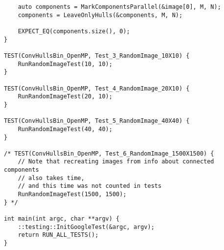 \documentclass[14pt, russian]{extarticle}
\begin{document}
\begin{lstlisting}
	auto components = MarkComponentsParallel(&image[0], M, N);
	components = LeaveOnlyHulls(&components, M, N);
	
	EXPECT_EQ(components.size(), 0);
}

TEST(ConvHullsBin_OpenMP, Test_3_RandomImage_10X10) {
	RunRandomImageTest(10, 10);
}

TEST(ConvHullsBin_OpenMP, Test_4_RandomImage_20X10) {
	RunRandomImageTest(20, 10);
}

TEST(ConvHullsBin_OpenMP, Test_5_RandomImage_40X40) {
	RunRandomImageTest(40, 40);
}

/* TEST(ConvHullsBin_OpenMP, Test_6_RandomImage_1500X1500) {
	// Note that recreating images from info about connected components
	// also takes time,
	// and this time was not counted in tests
	RunRandomImageTest(1500, 1500);
} */

int main(int argc, char **argv) {
	::testing::InitGoogleTest(&argc, argv);
	return RUN_ALL_TESTS();
}

	\end{lstlisting}
	\newpage
\end{document}
